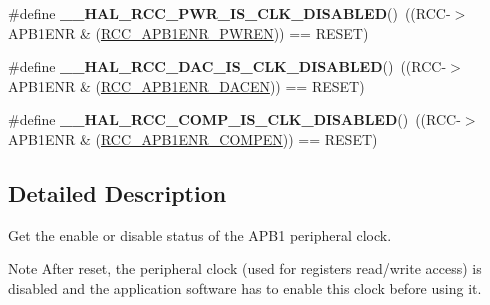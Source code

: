 \begin{DoxyCompactItemize}
\item 
\hypertarget{group___r_c_c___a_p_b1___peripheral___clock___enable___disable___status_ga1019fdeb30eb4bcb23a0bea2278a94a2}{\#define {\bfseries \-\_\-\-\_\-\-H\-A\-L\-\_\-\-R\-C\-C\-\_\-\-P\-W\-R\-\_\-\-I\-S\-\_\-\-C\-L\-K\-\_\-\-D\-I\-S\-A\-B\-L\-E\-D}()~((R\-C\-C-\/$>$A\-P\-B1\-E\-N\-R \& (\hyperlink{group___peripheral___registers___bits___definition_ga5c19997ccd28464b80a7c3325da0ca60}{R\-C\-C\-\_\-\-A\-P\-B1\-E\-N\-R\-\_\-\-P\-W\-R\-E\-N})) == R\-E\-S\-E\-T)}\label{group___r_c_c___a_p_b1___peripheral___clock___enable___disable___status_ga1019fdeb30eb4bcb23a0bea2278a94a2}

\item 
\hypertarget{group___r_c_c___a_p_b1___peripheral___clock___enable___disable___status_gadb2c1ec9bfcc21993094506a39e08f33}{\#define {\bfseries \-\_\-\-\_\-\-H\-A\-L\-\_\-\-R\-C\-C\-\_\-\-D\-A\-C\-\_\-\-I\-S\-\_\-\-C\-L\-K\-\_\-\-D\-I\-S\-A\-B\-L\-E\-D}()~((R\-C\-C-\/$>$A\-P\-B1\-E\-N\-R \& (\hyperlink{group___peripheral___registers___bits___definition_ga087968e2786321fb8645c46b22eea132}{R\-C\-C\-\_\-\-A\-P\-B1\-E\-N\-R\-\_\-\-D\-A\-C\-E\-N})) == R\-E\-S\-E\-T)}\label{group___r_c_c___a_p_b1___peripheral___clock___enable___disable___status_gadb2c1ec9bfcc21993094506a39e08f33}

\item 
\hypertarget{group___r_c_c___a_p_b1___peripheral___clock___enable___disable___status_ga665c0d26e8ff9870531a65daad87c227}{\#define {\bfseries \-\_\-\-\_\-\-H\-A\-L\-\_\-\-R\-C\-C\-\_\-\-C\-O\-M\-P\-\_\-\-I\-S\-\_\-\-C\-L\-K\-\_\-\-D\-I\-S\-A\-B\-L\-E\-D}()~((R\-C\-C-\/$>$A\-P\-B1\-E\-N\-R \& (\hyperlink{group___peripheral___registers___bits___definition_ga25307398c31b0f372cad700d4c0d26ed}{R\-C\-C\-\_\-\-A\-P\-B1\-E\-N\-R\-\_\-\-C\-O\-M\-P\-E\-N})) == R\-E\-S\-E\-T)}\label{group___r_c_c___a_p_b1___peripheral___clock___enable___disable___status_ga665c0d26e8ff9870531a65daad87c227}

\end{DoxyCompactItemize}


\subsection{Detailed Description}
Get the enable or disable status of the A\-P\-B1 peripheral clock. \begin{DoxyNote}{Note}
After reset, the peripheral clock (used for registers read/write access) is disabled and the application software has to enable this clock before using it. 
\end{DoxyNote}
